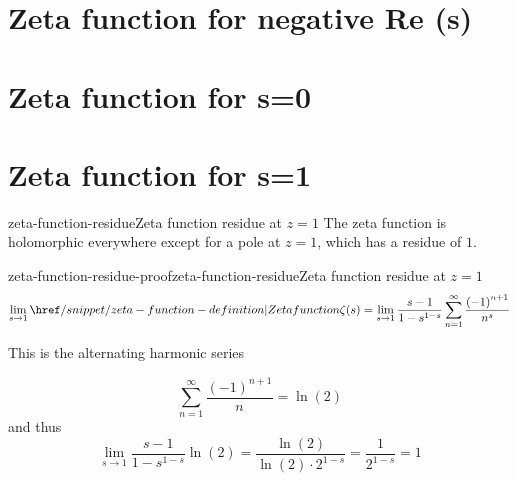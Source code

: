 \documentclass[preview]{standalone}
\begin{document}
\section{Zeta function for negative Re (s)}

\section{Zeta function for s=0}

\section{Zeta function for s=1}

\begin{snippetproposition}{zeta-function-residue}{Zeta function residue at \(z=1\)}
    The zeta function is holomorphic everywhere except for a pole at \(z=1\), which has a residue of \(1\).
\end{snippetproposition}

\begin{snippetproof}{zeta-function-residue-proof}{zeta-function-residue}{Zeta function residue at \(z=1\)}
    \[
        \lim_{s\to 1} \zetafn(s) =
        \lim_{s\to 1} \frac{s-1}{1-s^{1-s}} \sum_{n=1}^{\infty} \frac{{(-1)}^{n+1}}{n^s}
    \]
    
    This is the alternating harmonic series
    
    \[
        \sum_{n=1}^{\infty} \frac{{(-1)}^{n+1}}{n}=\ln(2)
    \]
    and thus
    \[
        \lim_{s\to 1} \frac{s-1}{1-s^{1-s}} \ln(2)
        = \frac{\ln(2)}{\ln(2) \cdot 2^{1-s}}
        = \frac{1}{2^{1-s}} = 1
    \]
\end{snippetproof}

\end{document}
